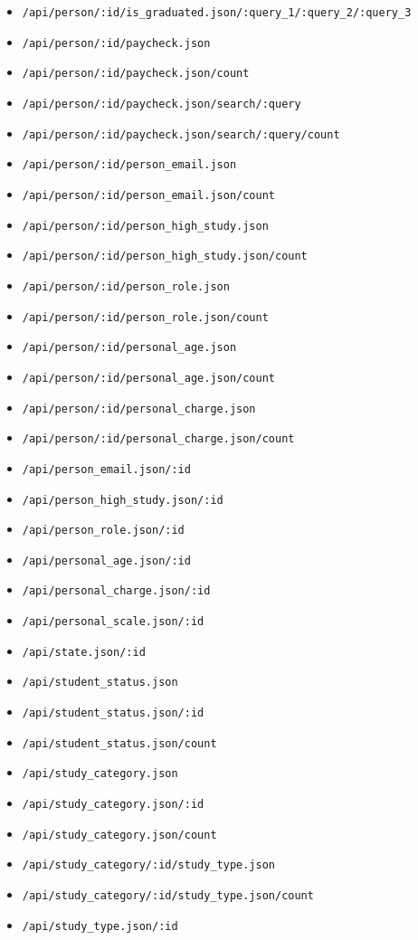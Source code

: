 \begin{itemize}
    \item \lstinline$/api/person/:id/is_graduated.json/:query_1/:query_2/:query_3$
    \item \lstinline$/api/person/:id/paycheck.json$
    \item \lstinline$/api/person/:id/paycheck.json/count$
    \item \lstinline$/api/person/:id/paycheck.json/search/:query$
    \item \lstinline$/api/person/:id/paycheck.json/search/:query/count$
    \item \lstinline$/api/person/:id/person_email.json$
    \item \lstinline$/api/person/:id/person_email.json/count$
    \item \lstinline$/api/person/:id/person_high_study.json$
    \item \lstinline$/api/person/:id/person_high_study.json/count$
    \item \lstinline$/api/person/:id/person_role.json$
    \item \lstinline$/api/person/:id/person_role.json/count$
    \item \lstinline$/api/person/:id/personal_age.json$
    \item \lstinline$/api/person/:id/personal_age.json/count$
    \item \lstinline$/api/person/:id/personal_charge.json$
    \item \lstinline$/api/person/:id/personal_charge.json/count$
    \item \lstinline$/api/person_email.json/:id$
    \item \lstinline$/api/person_high_study.json/:id$
    \item \lstinline$/api/person_role.json/:id$
    \item \lstinline$/api/personal_age.json/:id$
    \item \lstinline$/api/personal_charge.json/:id$
    \item \lstinline$/api/personal_scale.json/:id$
    \item \lstinline$/api/state.json/:id$
    \item \lstinline$/api/student_status.json$
    \item \lstinline$/api/student_status.json/:id$
    \item \lstinline$/api/student_status.json/count$
    \item \lstinline$/api/study_category.json$
    \item \lstinline$/api/study_category.json/:id$
    \item \lstinline$/api/study_category.json/count$
    \item \lstinline$/api/study_category/:id/study_type.json$
    \item \lstinline$/api/study_category/:id/study_type.json/count$
    \item \lstinline$/api/study_type.json/:id$
  \end{itemize}
\endgroup
